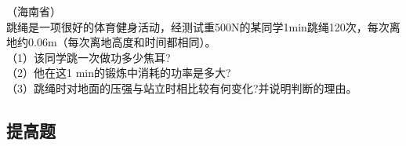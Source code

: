 \documentclass[12pt]{exam}
\begin{document}
\begin{questions}
\question
（海南省）\\
跳绳是一项很好的体育健身活动，经测试重500N的某同学1min跳绳120次，每次离地约0.06m（每次离地高度和时间都相同）。\\
（1）该同学跳一次做功多少焦耳?\\
（2）他在这1 min的锻炼中消耗的功率是多大?\\
（3）跳绳时对地面的压强与站立时相比较有何变化?并说明判断的理由。
\begin{solution}[30ex]

\end{solution}

\end{questions}













\begin{advanceexercises}
\section{提高题}

\end{advanceexercises}

\end{document}
